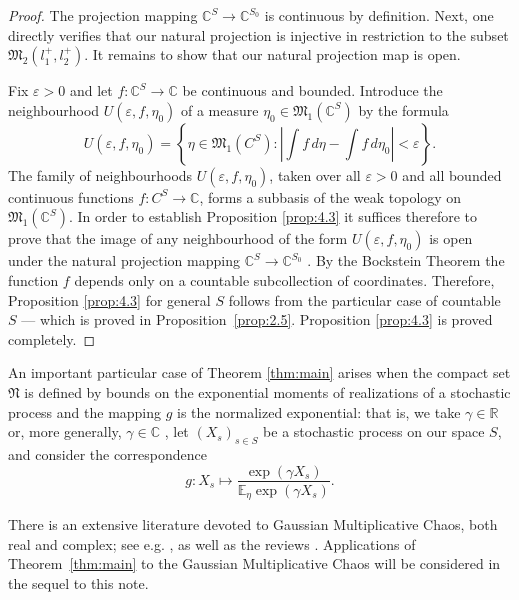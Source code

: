\documentclass[12pt,a4paper]{article}
\theoremstyle{definition}
\theoremstyle{remark}
\newcommand{\MM}{{\mathfrak{M}}}
\newcommand{\NN}{{\mathfrak{N}}}
\begin{document}
	\begin{proof}
		The projection mapping $\mathbb C^S \to \mathbb C^{S_0}$ is continuous by definition. Next, one directly verifies that our natural projection is injective in restriction to the subset $\MM_2(l_1^+, l_2^+)$. It remains to show that our natural projection map is open.
		
		Fix $\varepsilon > 0$ and let $f \colon \mathbb{C}^S \to \mathbb C$ be continuous and bounded.
		Introduce the neighbourhood $U(\varepsilon, f, \eta_0)$ of a measure $\eta_0 \in \MM_1(\mathbb{C}^S)$ by the formula
		\[
		U(\varepsilon, f, \eta_0) = \left\{ \eta \in \MM_1(C^S) :
		\left| \int f \, d\eta - \int f \, d\eta_0 \right| < \varepsilon \right\}.
		\]
		The family of neighbourhoods $U(\varepsilon, f, \eta_0)$, taken over all $\varepsilon > 0$ and all
		bounded continuous functions $f \colon C^S \to \mathbb{C}$, forms a subbasis of the weak topology on $\MM_1(\mathbb{C}^S)$.
In order to establish Proposition \ref{prop:4.3} it suffices therefore to prove that the image of any neighbourhood of the form $U(\varepsilon, f, \eta_0)$
is open under the natural projection  mapping $\mathbb C^S \to \mathbb C^{S_0}$ . By the Bockstein Theorem \cite{Bockstein} the function $f$ depends only
		on a countable subcollection of coordinates. Therefore,  Proposition \ref{prop:4.3} for general $S$ follows from the particular case of
		countable $S$ --- which  is proved in Proposition~\ref{prop:2.5}. Proposition \ref{prop:4.3} is proved completely.
	\end{proof}
	
	An important particular case of Theorem \ref{thm:main} arises when the compact set $\NN$ is defined by bounds on the exponential moments of realizations of a stochastic process and the mapping $g$ is the normalized exponential: that is, we take $\gamma \in \mathbb{R}$ or, more generally, $\gamma \in \mathbb{C}$ , let
 $(X_s)_{s \in S}$ be a stochastic process on our space $S$, and consider the correspondence
	\[
	g \colon X_s \mapsto \frac{\exp(\gamma X_s)}{\mathbb{E}_\eta \exp(\gamma X_s)}.
	\]
	
	There is an extensive literature devoted to Gaussian Multiplicative Chaos, both real and complex; see e.g. \cite{Berestycki2,Bufetov1,Bufetov2,Bufetov3,Chhaibi,FyodorovBouchaud,FyodorovKeating,FyodorovKhoruzhenkoSimm,Kahane,LacoinGMC,LacoinRRV,LacoinUniv,LambertOstrovskySimm,NajnudelEtAl,NikulaSaksmanWebb,RhodesVargas,Shamov,WebbCUE}, as well as the reviews \cite{BerestyckiPowell,RhodesVargas}. Applications of Theorem~\ref{thm:main} to the Gaussian Multiplicative Chaos will be considered in the sequel to this note.
	
\end{document}
